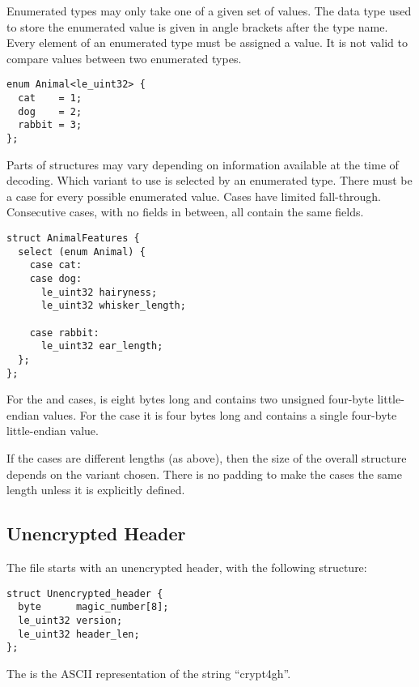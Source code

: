Enumerated types may only take one of a given set of values.
%
The data type used to store the enumerated value is given in angle brackets after the type name.
%
Every element of an enumerated type must be assigned a value.
%
It is not valid to compare values between two enumerated types.

\begin{verbatim}
enum Animal<le_uint32> {
  cat    = 1;
  dog    = 2;
  rabbit = 3;
};
\end{verbatim}

Parts of structures may vary depending on information available at the time of decoding.
%
Which variant to use is selected by an enumerated type.
%
There must be a case for every possible enumerated value.
%
Cases have limited fall-through.
%
Consecutive cases, with no fields in between, all contain the same fields.

\begin{verbatim}
struct AnimalFeatures {
  select (enum Animal) {
    case cat:
    case dog:
      le_uint32 hairyness;
      le_uint32 whisker_length;

    case rabbit:
      le_uint32 ear_length;
  };
};
\end{verbatim}

For the  and  cases,  is eight bytes long and contains two unsigned four-byte little-endian values.
%
For the  case it is four bytes long and contains a single four-byte little-endian value.

If the cases are different lengths (as above), then the size of the overall structure depends on the variant chosen.
%
There is no padding to make the cases the same length unless it is explicitly defined.

\subsection{Unencrypted Header}\label{unencrypted:header}

The file starts with an unencrypted header, with the following structure:

\begin{verbatim}
struct Unencrypted_header {
  byte      magic_number[8];
  le_uint32 version;
  le_uint32 header_len;
};
\end{verbatim}

The  is the ASCII representation of the string ``crypt4gh''.

